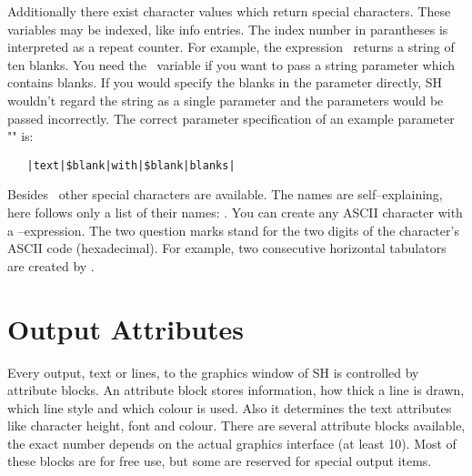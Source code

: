 \noindent
Additionally there exist character values which return special
characters.  These variables may be indexed, like info entries.
The index number in parantheses is interpreted as a repeat counter.
For example, the expression \ returns a string
of ten blanks.  You need the \ variable if you want
to pass a string parameter which contains blanks.  If you would
specify the blanks in the parameter directly, SH wouldn't regard
the string as a single parameter and the parameters would be passed
incorrectly.  The correct parameter specification of an example
parameter "" is:
\begin{verbatim}
   |text|$blank|with|$blank|blanks|
\end{verbatim}
Besides \ other special characters are available.
The names are self--explaining, here follows only a list of their
names: .  You can create any ASCII
character with a --expression.  The two
question marks stand for the two digits of the character's
ASCII code (hexadecimal).  For example, two consecutive horizontal
tabulators are created by .


\section{Output Attributes}
\label{sec:AttribBlocks}

Every output, text or lines, to the graphics window of SH is
controlled by attribute blocks.  An attribute block stores
information, how thick a line is drawn, which line style and
which colour is used.  Also it determines the text attributes
like character height, font and colour.  There are several
attribute blocks available, the exact number depends on the
actual graphics interface (at least 10).  Most of these blocks
are for free use, but some are reserved for special output items.

